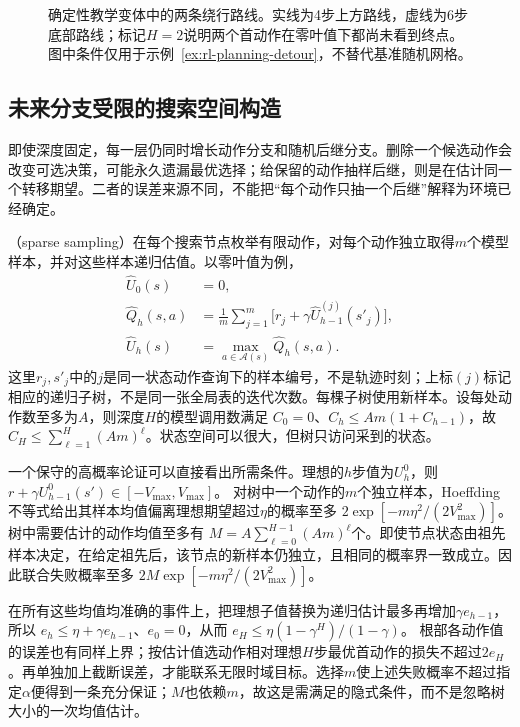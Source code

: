 \begin{figure}[htbp]
 \centering
 
 \caption{确定性教学变体中的两条绕行路线。实线为4步上方路线，虚线为6步底部路线；标记$H=2$说明两个首动作在零叶值下都尚未看到终点。图中条件仅用于示例~\ref{ex:rl-planning-detour}，不替代基准随机网格。}
 \label{fig:rl-planning-detour}
\end{figure}

\subsection{未来分支受限的搜索空间构造}
\label{sec:rl-planning-sparse-search}

即使深度固定，每一层仍同时增长动作分支和随机后继分支。删除一个候选动作会改变可选决策，可能永久遗漏最优选择；给保留的动作抽样后继，则是在估计同一个转移期望。二者的误差来源不同，不能把“每个动作只抽一个后继”解释为环境已经确定。

（sparse sampling）在每个搜索节点枚举有限动作，对每个动作独立取得$m$个模型样本，并对这些样本递归估值。以零叶值为例，
\begin{equation}
 \begin{aligned}
 \widehat U_0(s)&=0,\\
 \widehat Q_h(s,a)&=\frac1m\sum_{j=1}^{m}
       \bigl[r_j+\gamma\widehat U_{h-1}^{(j)}(s'_j)\bigr],\\
 \widehat U_h(s)&=\max_{a\in\mathcal A(s)}\widehat Q_h(s,a).
 \end{aligned}
 \label{eq:rl-planning-sparse-sampling}
\end{equation}
这里$r_j,s'_j$中的$j$是同一状态动作查询下的样本编号，不是轨迹时刻；上标$(j)$标记相应的递归子树，不是同一张全局表的迭代次数。每棵子树使用新样本。设每处动作数至多为$A$，则深度$H$的模型调用数满足
$C_0=0$、$C_h\leq Am(1+C_{h-1})$，故
$C_H\leq\sum_{\ell=1}^{H}(Am)^\ell$。状态空间可以很大，但树只访问采到的状态。

一个保守的高概率论证可以直接看出所需条件。理想的$h$步值为$U_h^0$，则
$r+\gamma U_{h-1}^0(s')\in[-V_{\max},V_{\max}]$。
对树中一个动作的$m$个独立样本，Hoeffding不等式给出其样本均值偏离理想期望超过$\eta$的概率至多
$2\exp[-m\eta^2/(2V_{\max}^2)]$。
树中需要估计的动作均值至多有
$M=A\sum_{\ell=0}^{H-1}(Am)^\ell$个。即使节点状态由祖先样本决定，在给定祖先后，该节点的新样本仍独立，且相同的概率界一致成立。因此联合失败概率至多
$2M\exp[-m\eta^2/(2V_{\max}^2)]$。

在所有这些均值均准确的事件上，把理想子值替换为递归估计最多再增加$\gamma e_{h-1}$，所以
$e_h\leq\eta+\gamma e_{h-1}$、$e_0=0$，从而
$e_H\leq\eta(1-\gamma^H)/(1-\gamma)$。
根部各动作值的误差也有同样上界；按估计值选动作相对理想$H$步最优首动作的损失不超过$2e_H$。再单独加上截断误差，才能联系无限时域目标。选择$m$使上述失败概率不超过指定$\alpha$便得到一条充分保证；$M$也依赖$m$，故这是需满足的隐式条件，而不是忽略树大小的一次均值估计。

